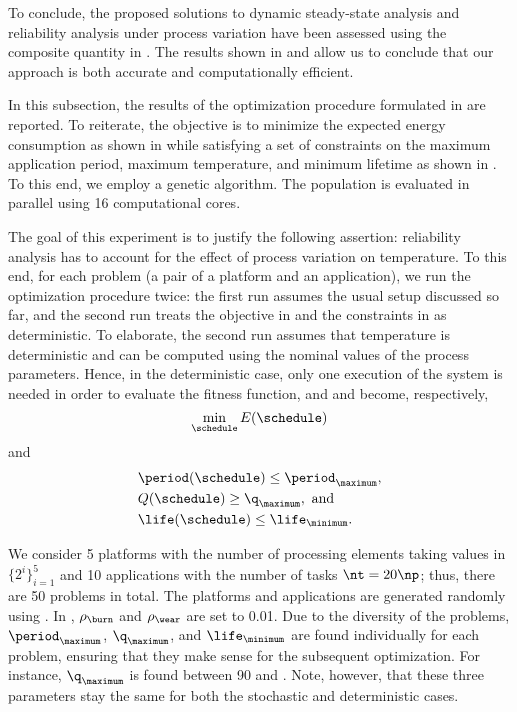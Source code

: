 To conclude, the proposed solutions to dynamic steady-state analysis and
reliability analysis under process variation have been assessed using the
composite quantity in . The results shown in
 and  allow us
to conclude that our approach is both accurate and computationally efficient.


In this subsection, the results of the optimization procedure formulated in
 are reported. To reiterate, the objective
is to minimize the expected energy consumption as shown in
 while satisfying a set of constraints on the
maximum application period, maximum temperature, and minimum lifetime as shown
in . To this end, we employ a genetic
algorithm. The population is evaluated in parallel using 16 computational cores.

The goal of this experiment is to justify the following assertion: reliability
analysis has to account for the effect of process variation on temperature. To
this end, for each problem (a pair of a platform and an application), we run the
optimization procedure twice: the first run assumes the usual setup discussed so
far, and the second run treats the objective in
 and the constraints in
 as deterministic. To elaborate, the second
run assumes that temperature is deterministic and can be computed using the
nominal values of the process parameters. Hence, in the deterministic case, only
one execution of the system is needed in order to evaluate the fitness function,
and  and 
become, respectively,
\[
    \min_{\schedule} E(\schedule)
\]
and
\begin{align*}
  & \period(\schedule) \leq \period_\maximum, \\
  & Q(\schedule) \geq \q_\maximum, \text{ and} \\
  & \life(\schedule) \leq \life_\minimum.
\end{align*}

We consider 5 platforms with the number of processing elements \np taking values
in $\{ 2^i \}_{i = 1}^5$ and 10 applications with the number of tasks $\nt = 20
\np$; thus, there are 50 problems in total. The platforms and applications are
generated randomly using  \cite{dick1998}. In
, $\rho_\burn$ and $\rho_\wear$ are set to
0.01. Due to the diversity of the problems, $\period_\maximum$, $\q_\maximum$,
and $\life_\minimum$ are found individually for each problem, ensuring that they
make sense for the subsequent optimization. For instance, $\q_\maximum$ is found
between 90 and . Note, however, that these three parameters stay
the same for both the stochastic and deterministic cases.

